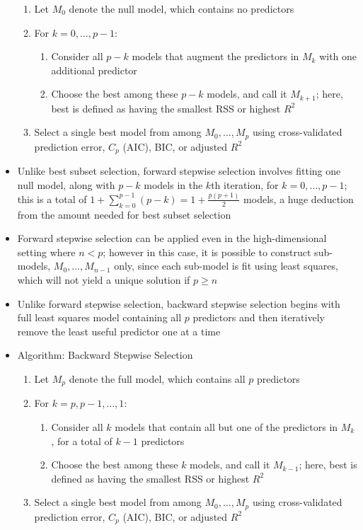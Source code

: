 \documentclass[12pt]{article}
\begin{document}
\begin{itemize}
\begin{enumerate}
\item Let $M_0$ denote the null model, which contains no predictors 
\item For $k=0,\dots,p-1$: \begin{enumerate} 
\item Consider all $p-k$ models that augment the predictors in $M_k$ with one additional predictor 
\item Choose the best among these $p-k$ models, and call it $M_{k+1}$; here, best is defined as having the smallest RSS or highest $R^2$ \end{enumerate} 
\item Select a single best model from among $M_0,\dots,M_p$ using cross-validated prediction error, $C_p$ (AIC), BIC, or adjusted $R^2$ \end{enumerate} 
\item Unlike best subset selection, forward stepwise selection involves fitting one null model, along with $p-k$ models in the $k$th iteration, for $k=0,\dots,p-1$; this is a total of $1+\sum_{k=0}^{p-1} (p-k) = 1 + \frac{p(p+1)}{2}$ models, a huge deduction from the amount needed for best subset selection 
\item Forward stepwise selection can be applied even in the high-dimensional setting where $n < p$; however in this case, it is possible to construct sub-models, $M_0,\dots,M_{n-1}$ only, since each sub-model is fit using least squares, which will not yield a unique solution if $p \geq n$ 
\item Unlike forward stepwise selection, backward stepwise selection begins with full least squares model containing all $p$ predictors and then iteratively remove the least useful predictor one at a time 
\item Algorithm: Backward Stepwise Selection \begin{enumerate} 
\item Let $M_p$ denote the full model, which contains all $p$ predictors 
\item For $k=p,p-1,\dots,1$: \begin{enumerate} 
\item Consider all $k$ models that contain all but one of the predictors in $M_k$, for a total of $k-1$ predictors 
\item Choose the best among these $k$ models, and call it $M_{k-1}$; here, best is defined as having the smallest RSS or highest $R^2$ \end{enumerate} 
\item Select a single best model from among $M_0,\dots,M_p$ using cross-validated prediction error, $C_p$ (AIC), BIC, or adjusted $R^2$ \end{enumerate} 

\end{itemize}
\end{document}
